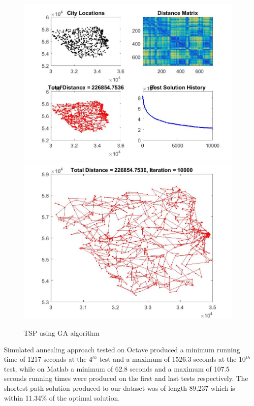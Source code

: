 \documentclass[twocolumn]{article}
\begin{document}
	\begin{figure}[h!]
		\centering
		\includegraphics[scale=0.25]{./GA1.jpg}
		\includegraphics[scale=0.25]{./GA2.jpg}
		\caption{TSP using GA algorithm}
		\label{fig:GAalgorithm}
	\end{figure}
	
	Simulated annealing approach tested on Octave produced a minimum running time of 1217 seconds at the 4$^{th}$ test and a maximum of 1526.3 seconds at the 10$^{th}$ test, while on Matlab a minimum of 62.8 seconds and a maximum of 107.5 seconds running times were produced on the first and last tests respectively. The shortest path solution produced to our dataset was of length 89,237 which is within 11.34\% of the optimal solution.
	
\end{document}
